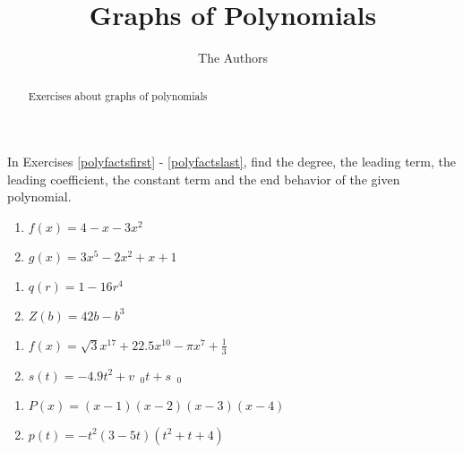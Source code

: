 \documentclass{ximera}
\author{The Authors}
\title{Graphs of Polynomials}
\begin{document}
\begin{abstract}
Exercises about graphs of polynomials
\end{abstract}
\maketitle

\renewcommand{\theenumi}{\arabic{enumi}.}

In Exercises \ref{polyfactsfirst} - \ref{polyfactslast}, find the degree, the leading term, the leading coefficient, the constant term and the end behavior of the given polynomial.

\begin{enumerate}

\item  $f(x) = 4-x-3x^2$ \label{polyfactsfirst}
\item  $g(x) = 3x^5 - 2x^2 + x + 1$

\setcounter{HW}{\value{enumi}}
\end{enumerate}

\begin{enumerate}
\setcounter{enumi}{\value{HW}}

\item $q(r) = 1 - 16r^{4}$
\item $Z(b) = 42b - b^{3}$

\setcounter{HW}{\value{enumi}}
\end{enumerate}


\begin{enumerate}
\setcounter{enumi}{\value{HW}}

\item $f(x) = \sqrt{3}x^{17} + 22.5x^{10} - \pi x^{7} + \frac{1}{3}$
\item $s(t) = -4.9t^{2} + v_{\mbox{ $0$}}t + s_{\mbox{ $0$}}$

\setcounter{HW}{\value{enumi}}
\end{enumerate}

\begin{enumerate}
\setcounter{enumi}{\value{HW}}

\item $P(x) = (x - 1)(x - 2)(x - 3)(x - 4)$
\item $p(t) = -t^2(3 - 5t)(t^{2} + t + 4)$

\setcounter{HW}{\value{enumi}}
\end{enumerate}
\end{document}
